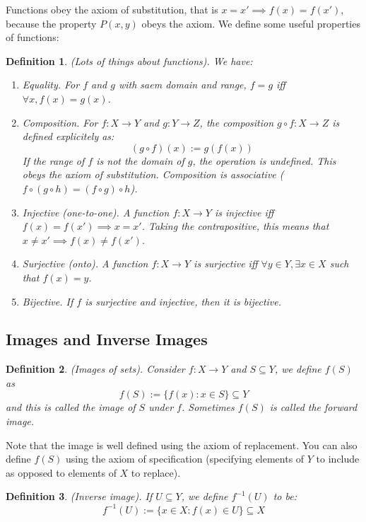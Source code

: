 \documentclass{article}
\newtheorem{definition}{Definition}[subsection]
\begin{document}
Functions obey the axiom of substitution, that is $x = x' \implies f(x) = f(x')$,
because the property $P(x,y)$ obeys the axiom. We define some useful 
properties of functions: 

\begin{definition}
	(Lots of things about functions). We have: 
	\begin{enumerate}
	\item Equality. For $f$ and $g$ with saem domain and range, $f = g$ iff
		$\forall x, f(x) = g(x)$.
	\item Composition. For $f:X\to Y$ and $g:Y\to Z$, the composition 
		$g \circ f: X \to Z$ is defined explicitely as: 
		$$
		(g \circ f)(x) := g(f(x))
		$$
		If the range of $f$ is not the domain of $g$, the operation 
		is undefined. This obeys the axiom of substitution. Composition 
		is associative ($f \circ (g \circ h) = (f \circ g) \circ h$).
	\item Injective (one-to-one). A function $f:X\to Y$ is injective iff 
		$f(x) = f(x') \implies x = x'$. Taking the contrapositive,
		this means that $x \neq x' \implies f(x) \neq f(x')$.
	\item Surjective (onto). A function $f:X\to Y$ is surjective iff 
		$\forall y \in Y, \exists x \in X$ such that $f(x) = y$.
	\item Bijective. If $f$ is surjective and injective, then it is 
		bijective.
	\end{enumerate}
\end{definition}

\subsection{Images and Inverse Images}

\begin{definition}
	(Images of sets). Consider $f: X \to Y$ and $S \subseteq Y$, 
	we define $f(S)$ as
	$$
	f(S) := \{f(x) : x \in S\} \subseteq Y
	$$
	and this is called the image of $S$ under $f$. Sometimes 
	$f(S)$ is called the forward image.
\end{definition}

Note that the image is well defined using the axiom of replacement.
You can also define $f(S)$ using the axiom of specification (specifying 
elements of $Y$ to include as opposed to elements of $X$ to replace).

\begin{definition}
	(Inverse image). If $U \subseteq Y$, we define $f^{-1}(U)$ to be:
	$$
	f^{-1}(U) := \{x \in X : f(x) \in U\} \subseteq X
	$$
\end{definition}
\end{document}
